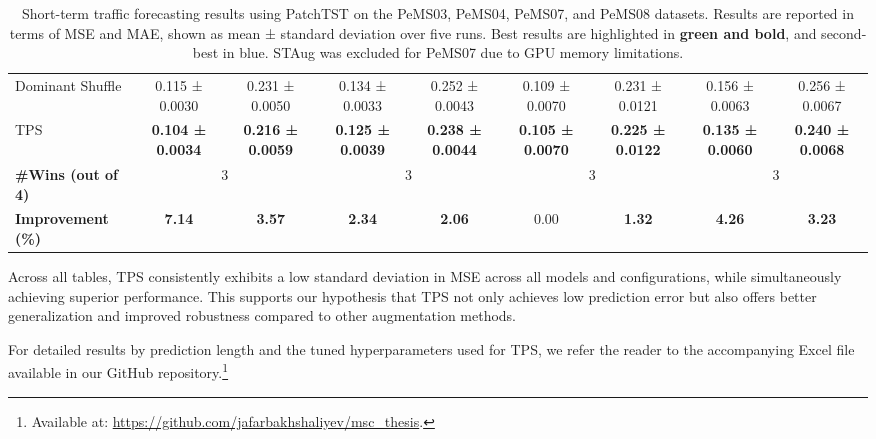 \begin{table}[h!]
\begin{adjustbox}{max width=\textwidth}
\begin{tabular}{l|cc|cc|cc|cc}
    Dominant Shuffle  & 0.115 ± 0.0030 & 0.231 ± 0.0050 & 0.134 ± 0.0033 & 0.252 ± 0.0043 & 0.109 ± 0.0070 & 0.231 ± 0.0121 & 0.156 ± 0.0063 & 0.256 ± 0.0067 \\
    TPS          & \cellcolor{bestcolor} \textbf{0.104 ± 0.0034} & \cellcolor{bestcolor} \textbf{0.216 ± 0.0059} & \cellcolor{bestcolor} \textbf{0.125 ± 0.0039} & \cellcolor{bestcolor} \textbf{0.238 ± 0.0044} & \cellcolor{bestcolor} \textbf{0.105 ± 0.0070} & \cellcolor{bestcolor} \textbf{0.225 ± 0.0122} & \cellcolor{bestcolor} \textbf{0.135 ± 0.0060} & \cellcolor{bestcolor} \textbf{0.240 ± 0.0068} \\
    \midrule
    \textbf{\#Wins (out of 4)} & \multicolumn{2}{c|}{3} & \multicolumn{2}{c|}{3} & \multicolumn{2}{c|}{3} & \multicolumn{2}{c}{3} \\
    \textbf{Improvement (\%)} & \cellcolor{bestcolor}\textbf{7.14} & \cellcolor{bestcolor} \textbf{3.57} & \cellcolor{bestcolor} \textbf{2.34} & \cellcolor{bestcolor} \textbf{2.06} & \cellcolor{baselinecolor}0.00 & \cellcolor{bestcolor}\textbf{1.32} & \cellcolor{bestcolor}\textbf{4.26} & \cellcolor{bestcolor}\textbf{3.23} \\
    \bottomrule
\end{tabular}
\end{adjustbox}
\caption{Short-term traffic forecasting results using PatchTST on the PeMS03, PeMS04, PeMS07, and PeMS08 datasets. Results are reported in terms of MSE and MAE, shown as mean ± standard deviation over five runs. Best results are highlighted in \textbf{green and bold}, and second-best in blue. STAug was excluded for PeMS07 due to GPU memory limitations.}
\label{tb:patchtst_shortterm}
\end{table}

Across all tables, TPS consistently exhibits a low standard deviation in MSE across all models and configurations, while simultaneously achieving superior performance. This supports our hypothesis that TPS not only achieves low prediction error but also offers better generalization and improved robustness compared to other augmentation methods.

For detailed results by prediction length and the tuned hyperparameters used for TPS, we refer the reader to the accompanying Excel file available in our GitHub repository.\footnote{Available at: \href{https://github.com/jafarbakhshaliyev/msc_thesis/blob/main/results/results_tsf_tsc.xlsx}{https://github.com/jafarbakhshaliyev/msc_thesis}.}




